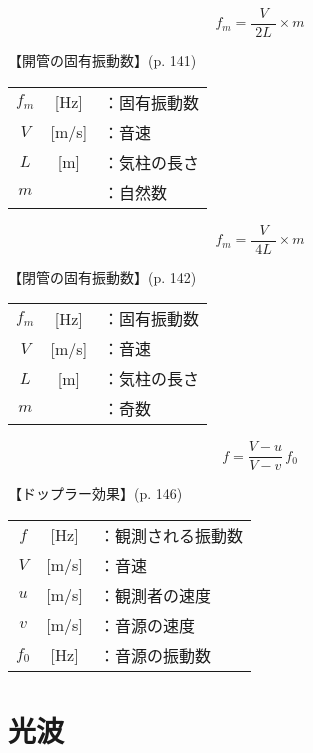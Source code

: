 \documentclass[10pt]{jarticle}
\begin{document}
\[
f_m = \frac{V}{\; 2L \;}\times m
\]


\vskip3mm
【開管の固有振動数】{\footnotesize (p. 141)}

\begin{tabular}{ccl}
$f_m$	&[Hz]	&：固有振動数\\
$V$	&[m/s]	&：音速\\
$L$	&[m]	&：気柱の長さ\\
$m$	&	&：自然数\\
\end{tabular}

\newpage





\[
f_m = \frac{V}{\; 4L \;}\times m
\]


\vskip3mm
【閉管の固有振動数】{\footnotesize (p. 142)}

\begin{tabular}{ccl}
$f_m$	&[Hz]	&：固有振動数\\
$V$	&[m/s]	&：音速\\
$L$	&[m]	&：気柱の長さ\\
$m$	&	&：奇数\\
\end{tabular}

\newpage






\[
f = \frac{V-u}{V-v}\, f_0
\]


\vskip3mm
【ドップラー効果】{\footnotesize (p. 146)}

\begin{tabular}{ccl}
$f$	&[Hz]	&：観測される振動数\\
$V$	&[m/s]	&：音速\\
$u$	&[m/s]	&：観測者の速度\\
$v$	&[m/s]	&：音源の速度\\
$f_0$	&[Hz]	&：音源の振動数\\
\end{tabular}

\newpage




\newpage
\addtocounter{page}{-1}
\thispagestyle{empty}
\section{光波}
\end{document}
